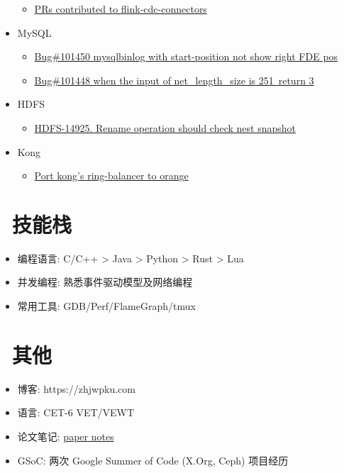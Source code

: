 \documentclass{resume}
\begin{document}
\begin{onehalfspacing}
\begin{itemize}
\begin{itemize}
        \item \href{https://github.com/ververica/flink-cdc-connectors/pulls?q=is%3Apr+author%3Azhjwpku+}{PRs contributed to flink-cdc-connectors}
      \end{itemize}
    \item MySQL
      \begin{itemize}
        \item \href{https://github.com/mysql/mysql-server/pull/313}{Bug\#101450 mysqlbinlog with start-position not show right FDE pos}
        \item \href{https://github.com/mysql/mysql-server/pull/311}{Bug\#101448 when the input of net\_length\_size is 251\, return 3}
      \end{itemize}
    \item HDFS
      \begin{itemize}
        \item \href{https://github.com/apache/hadoop/pull/1670/files}{HDFS-14925. Rename operation should check nest snapshot}
      \end{itemize}
    \item Kong
      \begin{itemize}
        \item \href{https://github.com/orlabs/orange/pull/138}{Port kong's ring-balancer to orange}
      \end{itemize}
  \end{itemize}
  \end{onehalfspacing}

\section{\faWrench\ 技能栈}
\begin{itemize}[parsep=0.5ex]
  \item 编程语言:  C/C++ > Java > Python > Rust > Lua
  \item 并发编程: 熟悉事件驱动模型及网络编程
  \item 常用工具: GDB/Perf/FlameGraph/tmux
\end{itemize}

\section{\faCogs\ 其他}
\begin{itemize}[parsep=0.5ex]
  \item 博客: https://zhjwpku.com
  \item 语言: CET-6 VET/VEWT
  \item 论文笔记: \href{https://paper-notes.zhjwpku.com/}{paper notes}
  \item GSoC: 两次 Google Summer of Code (X.Org, Ceph) 项目经历
\end{itemize}
\end{document}
